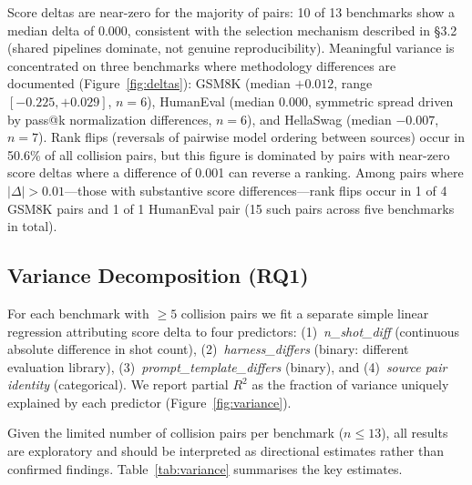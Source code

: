 \documentclass[11pt]{article}
\begin{document}
Score deltas are near-zero for the majority of pairs: 10 of 13 benchmarks
show a median delta of 0.000, consistent with the selection mechanism
described in \S3.2 (shared pipelines dominate, not genuine reproducibility).
Meaningful variance is concentrated on three benchmarks where methodology
differences are documented (Figure~\ref{fig:deltas}):
GSM8K (median $+0.012$, range $[-0.225, +0.029]$, $n=6$),
HumanEval (median $0.000$, symmetric spread driven by pass@k
normalization differences, $n=6$),
and HellaSwag (median $-0.007$, $n=7$).
Rank flips (reversals of pairwise model ordering between sources) occur in
50.6\% of all collision pairs, but this figure is dominated by pairs with
near-zero score deltas where a difference of 0.001 can reverse a ranking.
Among pairs where $|\Delta| > 0.01$---those with substantive score
differences---rank flips occur in 1 of 4 GSM8K pairs and 1 of 1
HumanEval pair (15 such pairs across five benchmarks in total).

\subsection{Variance Decomposition (RQ1)}
\label{sec:variance}

For each benchmark with $\geq 5$ collision pairs we fit a separate simple
linear regression attributing score delta to four predictors:
(1)~\emph{n\_shot\_diff} (continuous absolute difference in shot count),
(2)~\emph{harness\_differs} (binary: different evaluation library),
(3)~\emph{prompt\_template\_differs} (binary), and
(4)~\emph{source pair identity} (categorical).
We report partial $R^2$ as the fraction of variance uniquely explained
by each predictor (Figure~\ref{fig:variance}).

Given the limited number of collision pairs per benchmark
($n \leq 13$), all results are exploratory and should be interpreted
as directional estimates rather than confirmed findings.
Table~\ref{tab:variance} summarises the key estimates.
\end{document}

